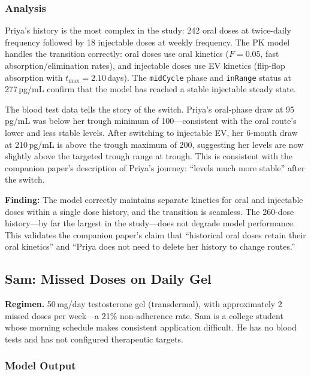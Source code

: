 \documentclass[11pt,a4paper]{article}
\newcommand{\code}[1]{\texttt{\small #1}}
\begin{document}
\subsubsection{Analysis}

Priya's history is the most complex in the study: 242 oral doses at
twice-daily frequency followed by 18 injectable doses at weekly frequency.
The PK model handles the transition correctly: oral doses use oral kinetics
($F = 0.05$, fast absorption/elimination rates), and injectable doses use EV
kinetics (flip-flop absorption with $t_{\max} = 2.10$\,days). The
\code{midCycle} phase and \code{inRange} status at 277\,pg/mL confirm that
the model has reached a stable injectable steady state.

The blood test data tells the story of the switch. Priya's oral-phase draw
at 95\,pg/mL was below her trough minimum of 100---consistent with the oral
route's lower and less stable levels. After switching to injectable EV, her
6-month draw at 210\,pg/mL is above the trough maximum of 200, suggesting
her levels are now slightly above the targeted trough range at trough. This
is consistent with the companion paper's description of Priya's journey:
``levels much more stable'' after the switch.

\textbf{Finding:} The model correctly maintains separate kinetics for oral
and injectable doses within a single dose history, and the transition is
seamless. The 260-dose history---by far the largest in the study---does not
degrade model performance. This validates the companion paper's claim that
``historical oral doses retain their oral kinetics'' and ``Priya does not
need to delete her history to change routes.''

\subsection{Sam: Missed Doses on Daily Gel}
\label{sec:sam}

\textbf{Regimen.} 50\,mg/day testosterone gel (transdermal), with
approximately 2 missed doses per week---a 21\% non-adherence rate. Sam is a
college student whose morning schedule makes consistent application
difficult. He has no blood tests and has not configured therapeutic targets.

\subsubsection{Model Output}
\end{document}
